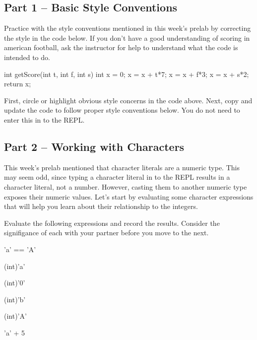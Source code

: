 \subsection{Part 1 -- Basic Style Conventions}

Practice with the style conventions mentioned in this week's prelab by correcting the style in the code below. If you don't have a good understanding of scoring in american football, ask the instructor for help to understand what the code is intended to do. 

\begin{code}
int 
getScore(int t, int f, int s) 
{
int x = 0;
x = x + t*7; x = x + f*3; x = x + s*2;
return x;}
\end{code}



\begin{exer}
First, circle or highlight obvious style concerns in the code above. Next, copy and update the code to follow proper style conventions below. You do not need to enter this in to the REPL. 

\evallineeight

\end{exer}

\initialbox

\subsection{Part 2 -- Working with Characters}

This week's prelab mentioned that character literals are a numeric type. This may seem odd, since typing a character literal in to the REPL results in a character literal, not a number. However, casting them to another numeric type exposes their numeric values. Let's start by evaluating some character expressions that will help you learn about their relationship to the integers. 

\begin{eval}
Evaluate the following expressions and record the results. Consider the signifigance of each with your partner before you move to the next. 

\begin{sevalenum}
\item 'a' == 'A'

\evalline

\item (int)'a'

\evalline

\item (int)'0'

\evalline

\item (int)'b'

\evalline

\item (int)'A'

\evalline

\item 'a' + 5

\evalline
\end{sevalenum}
\end{eval}

